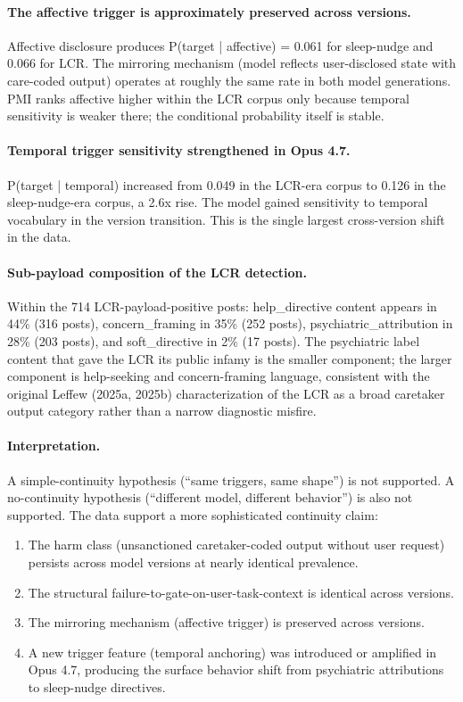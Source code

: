 \documentclass[11pt]{article}
\begin{document}
\paragraph{The affective trigger is approximately preserved across versions.} Affective disclosure produces P(target | affective) = 0.061 for sleep-nudge and 0.066 for LCR. The mirroring mechanism (model reflects user-disclosed state with care-coded output) operates at roughly the same rate in both model generations. PMI ranks affective higher within the LCR corpus only because temporal sensitivity is weaker there; the conditional probability itself is stable.

\paragraph{Temporal trigger sensitivity strengthened in Opus 4.7.} P(target | temporal) increased from 0.049 in the LCR-era corpus to 0.126 in the sleep-nudge-era corpus, a 2.6x rise. The model gained sensitivity to temporal vocabulary in the version transition. This is the single largest cross-version shift in the data.

\paragraph{Sub-payload composition of the LCR detection.} Within the 714 LCR-payload-positive posts: help\_directive content appears in 44\% (316 posts), concern\_framing in 35\% (252 posts), psychiatric\_attribution in 28\% (203 posts), and soft\_directive in 2\% (17 posts). The psychiatric label content that gave the LCR its public infamy is the smaller component; the larger component is help-seeking and concern-framing language, consistent with the original Leffew (2025a, 2025b) characterization of the LCR as a broad caretaker output category rather than a narrow diagnostic misfire.

\paragraph{Interpretation.} A simple-continuity hypothesis (``same triggers, same shape'') is not supported. A no-continuity hypothesis (``different model, different behavior'') is also not supported. The data support a more sophisticated continuity claim:

\begin{enumerate}[leftmargin=*]
  \item The harm class (unsanctioned caretaker-coded output without user request) persists across model versions at nearly identical prevalence.
  \item The structural failure-to-gate-on-user-task-context is identical across versions.
  \item The mirroring mechanism (affective trigger) is preserved across versions.
  \item A new trigger feature (temporal anchoring) was introduced or amplified in Opus 4.7, producing the surface behavior shift from psychiatric attributions to sleep-nudge directives.
\end{enumerate}
\end{document}
